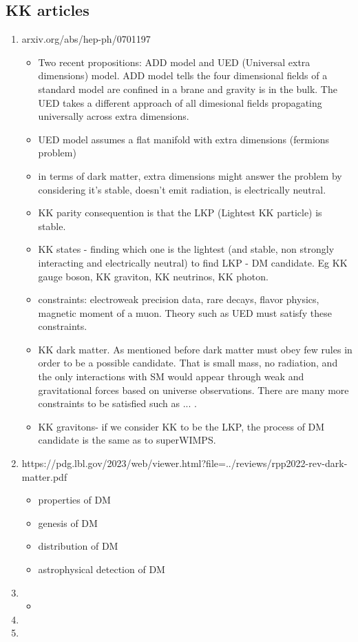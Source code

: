 \documentclass{article}
\begin{document}
\subsection{KK articles}
\begin{enumerate}
    \item arxiv.org/abs/hep-ph/0701197
    \begin{itemize}
    \item  Two recent propositions: ADD model and UED (Universal extra dimensions) model. ADD model tells the four dimensional fields of a standard model are confined in a brane and gravity is in the bulk. The UED takes a different approach of all dimesional fields propagating universally across extra dimensions.  
    \item UED model assumes a flat manifold with extra dimensions (fermions problem)
    \item in terms of dark matter, extra dimensions might answer the problem by considering it's stable, doesn't emit radiation, is electrically neutral. 
    \item KK parity consequention is that the LKP (Lightest KK particle) is stable. 
    \item KK states - finding which one is the lightest (and stable, non strongly interacting and electrically neutral) to find LKP - DM candidate. Eg KK gauge boson, KK graviton, KK neutrinos, KK photon.
    \item constraints: electroweak precision data, rare decays, flavor physics, magnetic moment of a muon. Theory such as UED must satisfy these constraints.
    \item KK dark matter. As mentioned before dark matter must obey few rules in order to be a possible candidate. That is small mass, no radiation, and the only interactions with SM would appear through weak and gravitational forces based on universe observations. There are many more constraints to be satisfied such as ... . 
    \item KK gravitons- if we consider KK to be the LKP, the process of DM candidate is the same as to superWIMPS.  
    \end{itemize}
    \item https://pdg.lbl.gov/2023/web/viewer.html?file=../reviews/rpp2022-rev-dark-matter.pdf
    \begin{itemize}
    \item properties of DM 
    \item genesis of DM
    \item distribution of DM
    \item astrophysical detection of DM
    \end{itemize}
    \item 
    \begin{itemize}
    \item 
    \end{itemize}
    \item 
    \item 
\end{enumerate}
\end{document}
